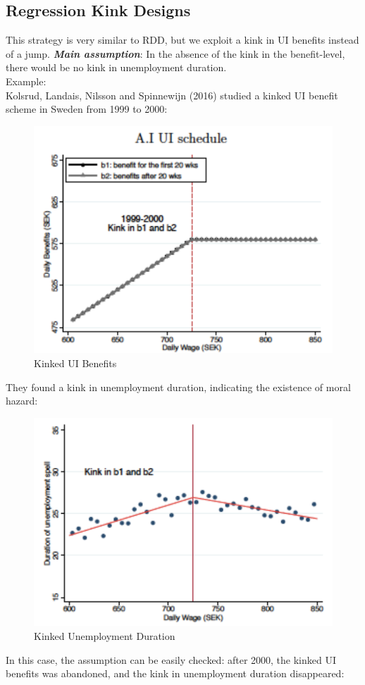     \subsection{Regression Kink Designs}
        This strategy is very similar to RDD, but we exploit a kink in UI benefits instead of a jump.
        \emph{\textbf{Main assumption}}: In the absence of the kink in the benefit-level, there would be no kink in unemployment duration.\\
        Example:\\
        Kolsrud, Landais, Nilsson and Spinnewijn (2016) studied a kinked UI benefit scheme in Sweden from 1999 to 2000:
        \begin{figure}[H]
            \centering
            \includegraphics[width = 3 in]{images/ch1/RKD_1.png}
            \caption{Kinked UI Benefits}
            \label{fig:RKD_1}
        \end{figure}
        They found a kink in unemployment duration, indicating the existence of moral hazard:
        \begin{figure}[H]
            \centering
            \includegraphics[width = 3 in]{images/ch1/RKD_2.png}
            \caption{Kinked Unemployment Duration}
            \label{fig:RKD_2}
        \end{figure}
        In this case, the assumption can be easily checked: after 2000, the kinked UI benefits was abandoned, and the kink in unemployment duration disappeared:
